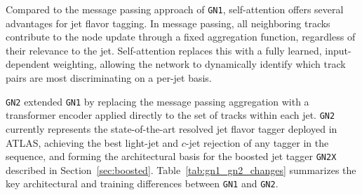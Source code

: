 Compared to the message passing approach of \texttt{GN1}, self-attention offers several advantages for jet flavor tagging. 
In message passing, all neighboring tracks contribute to the node update through a fixed aggregation function, regardless of their relevance to the jet.
Self-attention replaces this with a fully learned, input-dependent weighting, allowing the network to dynamically identify which track pairs are most discriminating on a per-jet basis.

\texttt{GN2} extended \texttt{GN1} by replacing the message passing aggregation with a transformer encoder applied directly to the set of tracks within each jet.
\texttt{GN2} currently represents the state-of-the-art resolved jet flavor tagger deployed in ATLAS, achieving the best light-jet and $c$-jet rejection of any tagger in the sequence, and forming the architectural basis for the boosted jet tagger \texttt{GN2X} described in Section~\ref{sec:boosted}.
Table~\ref{tab:gn1_gn2_changes} summarizes the key architectural and training differences between \texttt{GN1} and \texttt{GN2}.

\begin{table}[h]
    \centering
    \caption{Summary of changes between \texttt{GN1} and \texttt{GN2}~\cite{duperrin2023flavourtagginggraphneural}.}
    \label{tab:gn1_gn2_changes}
    \renewcommand{\arraystretch}{0.6}
\end{table}

